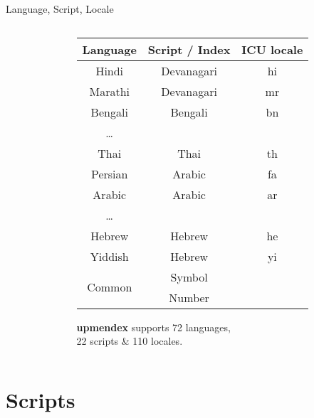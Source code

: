 \documentclass[aspectratio=169,10pt]{beamer}
\begin{document}
\begin{frame}[fragile]{Language, Script, Locale}
\begin{columns}
\begin{column}{70mm}
\begin{center}
\end{center}
\end{column}
\begin{column}{58mm}
\footnotesize
\begin{center}
\begin{tabular}{ccc}
  Language  & Script / Index & ICU locale \\\hline\hline
  Hindi     & Devanagari     & hi             \\
  Marathi   & Devanagari     & mr             \\
  Bengali   & Bengali        & bn             \\
  \ldots    &                &                \\\hdashline
  Thai      & Thai           & th             \\\hline
  Persian   & Arabic         & fa             \\
  Arabic    & Arabic         & ar             \\
  \ldots    &                &                \\\hdashline
  Hebrew    & Hebrew         & he             \\
  Yiddish   & Hebrew         & yi             \\\hline
  \multirow{2}{*}{Common}  & Symbol   &       \\
            & Number         &                \\\hline
\end{tabular}
\end{center}
\vspace{2mm}
\normalsize
\textbf{upmendex} supports 72 languages,\\22 scripts \& 110 locales.
\end{column}
\end{columns}
\end{frame}


\section{Scripts}
\end{document}
